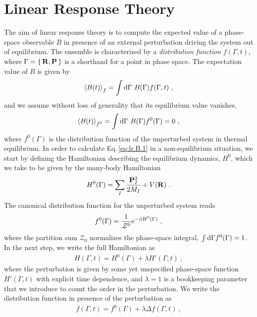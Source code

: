 \section{Linear Response Theory}
The aim of linear response theory is to compute the expected value of a phase-space observable $B$ in presence of an external perturbation driving the system out of equilibrium. The ensemble is characterized by a \emph{distribution function} $f(\Gamma, t)$, where $\Gamma = \set{{\bf R}, {\bf P}}$ is a shorthand for a point in phase space. The expectation value of $B$ is given by
\begin{align}
  \braket{B (t)}_{f}
    = \int \d \Gamma ~ B (\Gamma) f(\Gamma, t)~,
  \label{eq:lr.B.1}
\end{align}
and we assume without loss of generality that its equilibrium value vanishes,
\begin{align}
\braket{B (t)}_{f^0}
= \int \d \Gamma ~ B (\Gamma) f^0(\Gamma) = 0~,
\label{eq:lr.B0}
\end{align}
where $f^0 (\Gamma)$ is the distribution function of the unperturbed system in thermal equilibrium. In order to calculate Eq.\,\eqref{eq:lr.B.1} in a non-equilibrium situation, we start by defining the Hamiltonian describing the equilibrium dynamics, $H^0$, which we take to be given by the many-body Hamiltonian
\begin{align}
  H^0 (\Gamma) 
    = \sum_I \frac{\b P_I^2}{2 M_I} + V (\b R)~.
  \label{eq:lr.H0}
\end{align}
The canonical distribution function for the unperturbed system reads
\begin{align}
f^0 (\Gamma) 
= \frac{1}{\mathcal{Z}^0} {\rm e}^{- \beta H^0 (\Gamma)}~,
\label{eq:lr.f0}
\end{align}
where the partition sum $\mathcal{Z}_0$ normalizes the phase-space integral, \mbox{$\int {\rm d} \Gamma f^0 (\Gamma) = 1$}.
In the next step, we write the full Hamiltonian as
\begin{align}
  H (\Gamma, t)
   = H^0 (\Gamma) + \lambda H' (\Gamma, t)~,
  \label{eq:lr.H}
\end{align}
where the perturbation is given by some yet unspecified phase-space function $H' (\Gamma, t)$ with explicit time dependence, and $\lambda = 1$ is a bookkeeping parameter that we introduce to count the order in the perturbation.
We write the distribution function in presence of the perturbation as
\begin{align}
  f (\Gamma, t) = f^0(\Gamma) + \lambda \Delta f (\Gamma, t)~,
  \label{eq:lr.f}
\end{align}
